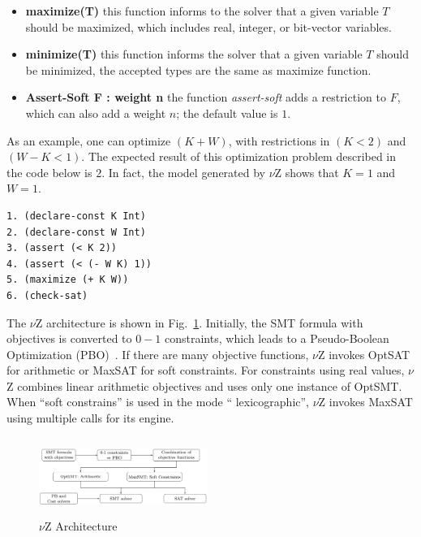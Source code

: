 \begin{itemize}
\item{\textbf{maximize(T)}
this function informs to the solver that a given variable $T$ should be maximized, which includes real, integer, or bit-vector variables.}
\item{\textbf{minimize(T)}
this function informs the solver that a given variable $T$ should be minimized, the accepted types are the same as maximize function.}
\item{\textbf{Assert-Soft F : weight n}
the function \textit{assert-soft} adds a restriction to $F$, which can also add a weight $n$; the default value is $1$.}
\end{itemize}

As an example, one can optimize $\left(K + W\right)$, with restrictions in $\left(K < 2\right)$ and $\left(W - K < 1\right)$. The expected result of this optimization problem described in the code below is $2$. In fact, the model generated by $\nu$Z shows that $K = 1$ and $W = 1$.

\begin{lstlisting}[caption=Example of SMT formula using $\nu$Z, label=vZ]
1. (declare-const K Int) 
2. (declare-const W Int)
3. (assert (< K 2)) 
4. (assert (< (- W K) 1))
5. (maximize (+ K W)) 
6. (check-sat)
\end{lstlisting}

The $\nu$Z architecture is shown in Fig.~\ref{vZ-Architecture}. Initially, the SMT formula with objectives is converted to $0-1$ constraints, which leads to a Pseudo-Boolean Optimization (PBO)~\cite{Barth1995,Vasco2005}. If there are many objective functions, $\nu$Z invokes OptSAT for arithmetic or MaxSAT for soft constraints. For constraints using real values, $\nu$Z combines linear arithmetic objectives and uses only one instance of OptSMT. When ``soft constrains'' is used in the mode `` lexicographic'', $\nu$Z invokes MaxSAT using multiple calls for its engine.
%
\begin{figure}[ht]
	\centering
  \includegraphics[width=0.49\textwidth, height=95px]{Image/vzArch.png} 
	\caption{$\nu$Z Architecture~\cite{Bjorner2015}}
	\label{vZ-Architecture}
\end{figure}

